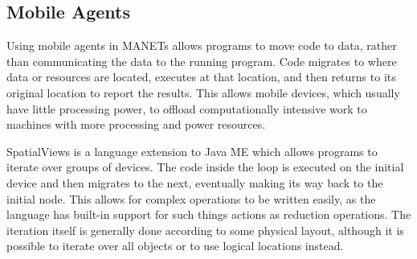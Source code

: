\subsection{Mobile Agents}

Using mobile agents in MANETs allows programs to move code to data, rather than communicating the data to the running program. Code migrates to where data or resources are located, executes at that location, and then returns to its original location to report the results. This allows mobile devices, which usually have little processing power, to offload computationally intensive work to machines with more processing and power resources.

SpatialViews\cite{sv} is a language extension to Java ME which allows programs to iterate over groups of devices. The code inside the loop is executed on the initial device and then migrates to the next, eventually making its way back to the initial node. This allows for complex operations to be written easily, as the language has built-in support for such things actions as reduction operations. The iteration itself is generally done according to some physical layout, although it is possible to iterate over all objects or to use logical locations instead.
